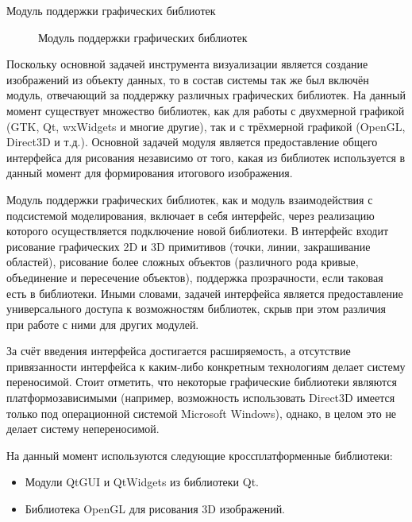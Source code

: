 \documentclass[a4paper,12pt]{extarticle}
\begin{document}
\begin{subsection}{Модуль поддержки графических библиотек}
    \label{sec:architecture-graphics}
    \begin{figure}[h]
        \caption{Модуль поддержки графических библиотек}
        \label{ris:architecture-graphics}
    \end{figure}
    
    Поскольку основной задачей инструмента визуализации является создание изображений из объекту данных, то в состав системы так же был включён модуль, отвечающий за поддержку различных графических библиотек. На данный момент существует множество библиотек, как для работы с двухмерной графикой (GTK, Qt, wxWidgets и многие другие), так и с трёхмерной графикой (OpenGL, Direct3D и т.д.). Основной задачей модуля является предоставление общего интерфейса для рисования независимо от того, какая из библиотек используется в данный момент для формирования итогового изображения.

    Модуль поддержки графических библиотек, как и модуль взаимодействия с подсистемой моделирования, включает в себя интерфейс, через реализацию которого осуществляется подключение новой библиотеки. В интерфейс входит рисование графических 2D и 3D примитивов (точки, линии, закрашивание областей), рисование более сложных объектов (различного рода кривые, объединение и пересечение объектов), поддержка прозрачности, если таковая есть в библиотеки. Иными словами, задачей интерфейса является предоставление универсального доступа к возможностям библиотек, скрыв при этом различия при работе с ними для других модулей.

    За счёт введения интерфейса достигается расширяемость, а отсутствие привязанности интерфейса к каким-либо конкретным технологиям делает систему переносимой. Стоит отметить, что некоторые графические библиотеки являются платформозависимыми (например, возможность использовать Direct3D имеется только под операционной системой Microsoft Windows), однако, в целом это не делает систему непереносимой.

    На данный момент используются следующие кроссплатформенные библиотеки:
    \begin{itemize}
        \item Модули QtGUI и QtWidgets из библиотеки Qt.
        \item Библиотека OpenGL для рисования 3D изображений.
    \end{itemize}
\end{subsection}
\end{document}
